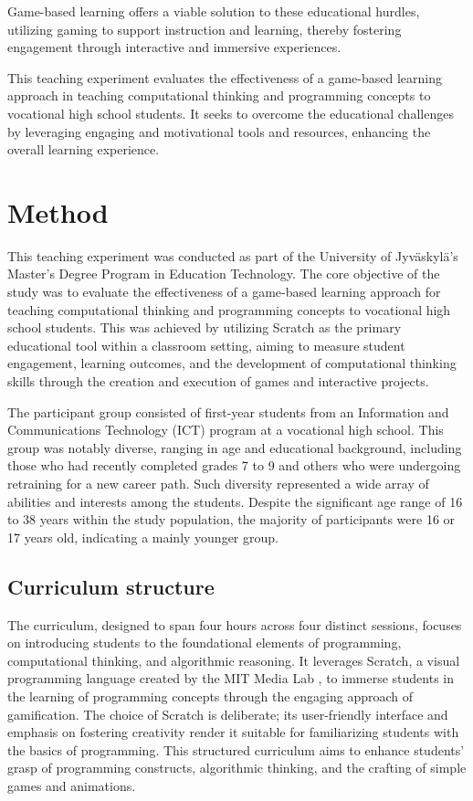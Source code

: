 \documentclass[final,5p,times,twocolumn,authoryear]{elsarticle}
\begin{document}
Game-based learning offers a viable solution to these educational hurdles, utilizing gaming to support instruction and learning, thereby fostering engagement through interactive and immersive experiences.
\citep{prensky2009h}

This teaching experiment evaluates the effectiveness of a game-based learning approach in teaching computational thinking and programming concepts to vocational high school students. It seeks to overcome the educational challenges by leveraging engaging and motivational tools and resources, enhancing the overall learning experience.

\section{Method}
This teaching experiment was conducted as part of the University of Jyväskylä's Master's Degree Program in Education Technology. The core objective of the study was to evaluate the effectiveness of a game-based learning approach for teaching computational thinking and programming concepts to vocational high school students. This was achieved by utilizing Scratch as the primary educational tool within a classroom setting, aiming to measure student engagement, learning outcomes, and the development of computational thinking skills through the creation and execution of games and interactive projects.

The participant group consisted of first-year students from an Information and Communications Technology (ICT) program at a vocational high school. This group was notably diverse, ranging in age and educational background, including those who had recently completed grades 7 to 9 and others who were undergoing retraining for a new career path. Such diversity represented a wide array of abilities and interests among the students. Despite the significant age range of 16 to 38 years within the study population, the majority of participants were 16 or 17 years old, indicating a mainly younger group.

\subsection{Curriculum structure}
The curriculum, designed to span four hours across four distinct sessions, focuses on introducing students to the foundational elements of programming, computational thinking, and algorithmic reasoning. It leverages Scratch, a visual programming language created by the MIT Media Lab  \citep{resnick2009scratch}, to immerse students in the learning of programming concepts through the engaging approach of gamification. The choice of Scratch is deliberate; its user-friendly interface and emphasis on fostering creativity render it suitable for familiarizing students with the basics of programming. \citep{maloney2010scratch} This structured curriculum aims to enhance students' grasp of programming constructs, algorithmic thinking, and the crafting of simple games and animations.
\end{document}
